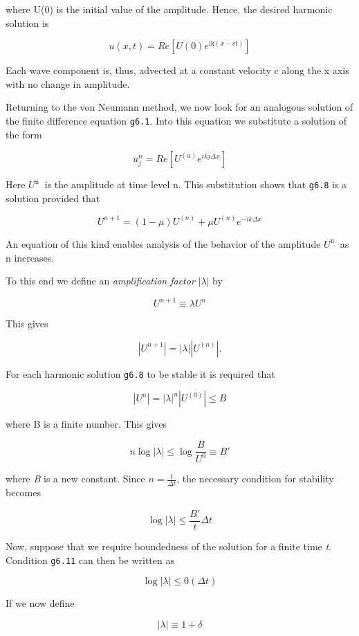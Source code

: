 where U(0) is the initial value of the amplitude. Hence, the desired
harmonic solution is

    \[u\left( x,t \right) =Re \left\lbrack U\left( 0 \right)e^{\text{ik}\left( x - ct \right)} \right\rbrack\]

Each wave component is, thus, advected at a constant velocity c along
the x axis with no change in amplitude.

Returning to the von Neumann method, we now look for an analogous
solution of the finite difference equation \texttt{g6.1}. Into this
equation we substitute a solution of the form

    \[u_{j}^{n} = Re \left\lbrack U^{\left( u \right)}e^{ikj\Delta x} \right\rbrack\]

Here \(U^{\text{n }}\) is the amplitude at time level n. This
substitution shows that \texttt{g6.8} is a solution provided that

    \[U^{n + 1} = \left( 1 - \mu \right)U^{\left( n \right)}  + \mu U^{\left( n \right)}e^{- ik\Delta x}\]

An equation of this kind enables analysis of the behavior of the
amplitude \(U^{\text{n }}\) as n increases.

To this end we define an \emph{amplification factor}
\(\left| \lambda \right|\) by

    \[U^{n + 1} \equiv \lambda U^{n}\]

This gives

\[|U^{n + 1}| = |\lambda | | U^{(n)} |.\]

For each harmonic solution \texttt{g6.8} to be stable it is required
that

\[|U^{n}| =|\lambda |^n | U^{(0)} | \leq B\]

where B is a finite number. This gives

\[n\log |\lambda | \leq \log \frac{B}{U^0} \equiv B'\]

where \emph{B\textquotesingle{}} is a new constant. Since
\(n = \frac{t}{\Delta t}\), the necessary condition for stability
becomes

    \[\log |\lambda | \leq \frac{B'}{t} \Delta t\]

Now, suppose that we require boundedness of the solution for a finite
time \emph{t}. Condition \texttt{g6.11} can then be written as

\[\log|\lambda| \leq 0( \Delta t )\]

If we now define

\[\left| \lambda \right| \equiv 1 + \delta\]

